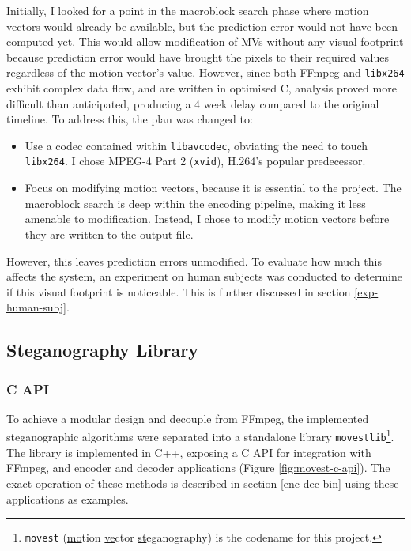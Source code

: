 \documentclass[12pt,british,twoside,notitlepage,usenames,dvipsnames,hypens,final]{report}
\numberwithin{equation}{section}
\numberwithin{figure}{section}
\begin{document}
Initially, I looked for a point in the macroblock search phase where motion vectors would already be available, but the prediction error would not have been computed yet. This would allow modification of MVs without any visual footprint because prediction error would have brought the pixels to their required values regardless of the motion vector's value. However, since both FFmpeg and \texttt{libx264} exhibit complex data flow, and are written in optimised C, analysis proved more difficult than anticipated, producing a 4 week delay compared to the original timeline. To address this, the plan was changed to:
\begin{itemize}
\item Use a codec contained within \texttt{libavcodec}, obviating the need to touch \texttt{libx264}. I chose MPEG-4 Part 2 (\texttt{xvid}), H.264's popular predecessor.
\item Focus on modifying motion vectors, because it is essential to the project. The macroblock search is deep within the encoding pipeline, making it less amenable to modification. Instead, I chose to modify motion vectors before they are written to the output file.
\end{itemize}

However, this leaves prediction errors unmodified. To evaluate how much this affects the system, an experiment on human subjects was conducted to determine if this visual footprint is noticeable. This is further discussed in section \ref{exp-human-subj}.

\subsection{Steganography Library}

\subsubsection{C API}

To achieve a modular design and decouple from FFmpeg, the implemented steganographic algorithms were separated into a standalone library \texttt{movestlib}\footnote{\texttt{movest} (\underline{mo}tion \underline{ve}ctor \underline {st}eganography) is the codename for this project.}. The library is implemented in C++, exposing a C API for integration with FFmpeg, and encoder and decoder applications (Figure \ref{fig:movest-c-api}). The exact operation of these methods is described in section \ref{enc-dec-bin} using these applications as examples.
\end{document}
